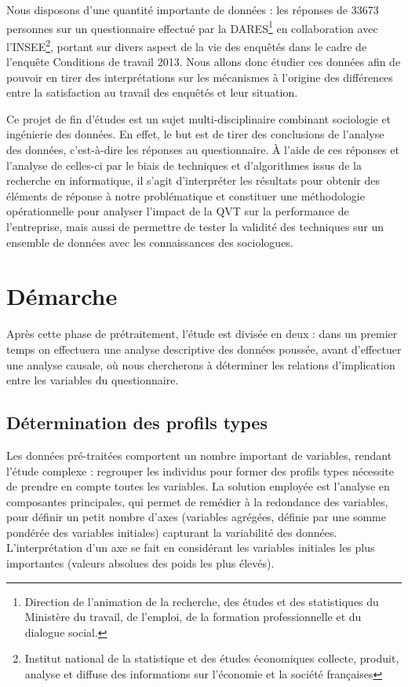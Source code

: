 \documentclass[11pt,fleqn,openany,frenchb]{book} %
\begin{document}
Nous disposons d'une quantité importante de données : les réponses de 33673 personnes sur un questionnaire effectué par la DARES\footnote{Direction de l'animation de la recherche, des études et des statistiques du Ministère du travail, de l'emploi, de la formation professionnelle et du dialogue social.} en collaboration avec l'INSEE\footnote{Institut national de la statistique et des études économiques collecte, produit, analyse et diffuse des informations sur l'économie et la société françaises}, portant sur divers aspect de la vie des enquêtés dans le cadre de l'enquête Conditions de travail 2013. Nous allons donc étudier ces données afin de pouvoir en tirer des interprétations sur les mécanismes à l'origine des différences entre la satisfaction au travail des enquêtés et leur situation.\par

Ce projet de fin d'études est un sujet multi-disciplinaire combinant sociologie et ingénierie des données. En effet, le but est de tirer des conclusions de l'analyse des données, c'est-à-dire les réponses au questionnaire. \`A l'aide de ces réponses et l'analyse de celles-ci par le biais de techniques et d'algorithmes issus de la recherche en informatique, il s'agit d'interpréter les résultats pour obtenir des éléments de réponse à notre problématique et constituer une  méthodologie opérationnelle pour analyser l'impact de la QVT sur la performance de l'entreprise, mais aussi de permettre de tester la validité des techniques sur un ensemble de données avec les connaissances des sociologues.\par


\section{Démarche}
Après cette phase de prétraitement, l'étude est divisée en deux : dans un premier temps on effectuera une analyse descriptive des données poussée, avant d'effectuer une analyse causale, où nous chercherons à déterminer les relations d'implication entre les variables du questionnaire.\par

\subsection{Détermination des profils types}
Les données pré-traitées comportent un nombre important de variables, rendant l'étude complexe : regrouper les individus pour former des profils types nécessite de prendre en compte toutes les variables. La solution employée est l'analyse en composantes principales, qui permet de remédier à la redondance des variables, pour définir un petit nombre d'axes (variables agrégées, définie par une somme pondérée des variables initiales) capturant la variabilité des données. L'interprétation d'un axe se fait en considérant les variables initiales les plus importantes (valeurs absolues des poids les plus élevés). \par
\end{document}
